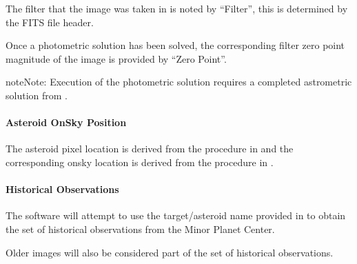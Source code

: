 \documentclass[letterpaper,11pt,english]{sphinxmanual}
\begin{document}
\sphinxAtStartPar
The filter that the image was taken in is noted by “Filter”, this is
determined by the FITS file header.

\sphinxAtStartPar
Once a photometric solution has been solved, the corresponding filter zero
point magnitude of the image is provided by “Zero Point”.

\begin{sphinxadmonition}{note}{Note:}
\sphinxAtStartPar
Execution of the photometric solution requires a completed astrometric
solution from
{\hyperref[\detokenize{user/manual_mode:user-manual-mode-procedure-find-asteroid-location-compute-astrometric-solution}]{}}.
\end{sphinxadmonition}


\paragraph{Asteroid On\sphinxhyphen{}Sky Position}
\label{\detokenize{user/manual_mode:asteroid-on-sky-position}}\label{\detokenize{user/manual_mode:user-manual-mode-procedure-asteroid-on-sky-position}}
\sphinxAtStartPar
The asteroid pixel location is derived from the procedure in
{\hyperref[\detokenize{user/manual_mode:user-manual-mode-procedure-find-asteroid-location-target-selector-gui}]{}}
and the corresponding on\sphinxhyphen{}sky location is derived from the procedure in
{\hyperref[\detokenize{user/manual_mode:user-manual-mode-procedure-find-asteroid-location-compute-astrometric-solution}]{}}.


\paragraph{Historical Observations}
\label{\detokenize{user/manual_mode:historical-observations}}\label{\detokenize{user/manual_mode:user-manual-mode-procedure-historical-observations}}
\sphinxAtStartPar
The software will attempt to use the target/asteroid name provided in
{\hyperref[\detokenize{user/manual_mode:user-manual-mode-procedure-specify-new-target-name}]{}}
to obtain the set of historical observations from the Minor Planet Center.

\sphinxAtStartPar
Older images will also be considered part of the set of historical observations.
\end{document}
